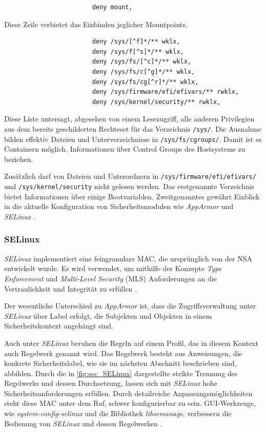 \documentclass[../main.tex]{subfiles}
\begin{document}
					\begin{lstlisting}
						deny mount,
					\end{lstlisting}
					Diese Zeile verbietet das Einbinden jeglicher Mountpoints.

					\begin{lstlisting}
						deny /sys/[^f]*/** wklx,
						deny /sys/f[^s]*/** wklx,
						deny /sys/fs/[^c]*/** wklx,
						deny /sys/fs/c[^g]*/** wklx,
						deny /sys/fs/cg[^r]*/** wklx,
						deny /sys/firmware/efi/efivars/** rwklx,
						deny /sys/kernel/security/** rwklx,
					\end{lstlisting}
					Diese Liste untersagt, abgesehen von einem Lesezugriff, alle anderen Privilegien aus dem bereits geschilderten Rechteset für das Verzeichnis \texttt{/sys/}. Die Ausnahme bilden effektiv Dateien und Unterverzeichnisse in \texttt{/sys/fs/cgroups/}. Damit ist es Containern möglich, Informationen über Control Groups des Hostsystems zu beziehen.

					Zusätzlich darf von Dateien und Unterordnern in \texttt{/sys/firmware/efi/efivars/} und \texttt{/sys/kernel/security} nicht gelesen werden. Das erstgenannte Verzeichnis bietet Informationen über einige Bootvariablen. Zweitgenanntes gewährt Einblick in die aktuelle Konfiguration von Sicherheitsmodulen wie \emph{AppArmor} und \emph{SELinux} \cite{apparmorEFI}\cite{apparmorSecurityFS}\cite{apparmorLWNSecurityFS}.

  		\subsubsection{\acrshort{SELinux}}
			\label{selinux}
				\emph{SELinux} implementiert eine feingranulare MAC, die ursprünglich von der \acrshort{NSA} entwickelt wurde. Es wird verwendet, um mithilfe der Konzepte \emph{Type Enforcement} und \emph{Multi-Level Security} (\acrshort{MLS}) Anforderungen an die Vertraulichkeit und Integrität zu erfüllen \cite{redhatSec}. %

				Der wesentliche Unterschied zu \emph{AppArmor} ist, dass die Zugriffsverwaltung unter \emph{SELinux} über Label erfolgt, die Subjekten und Objekten in einem Sicherheitskontext angehängt sind.


				Auch unter \emph{SELinux} beruhen die Regeln auf einem Profil, das in diesem Kontext auch Regelwerk genannt wird. Das Regelwerk besteht aus Anweisungen, die konkrete Sicherheitslabel, wie sie im nächsten Abschnitt beschrieben sind, abbilden. Durch die in \fig \ref{fig:sec_SELinux} dargestellte strikte Trennung des Regelwerks und dessen Durchsetzung, lassen sich mit \emph{SELinux} hohe Sicherheitsanforderungen erfüllen. Durch detailreiche Anpassungsmöglichkeiten steht diese MAC unter dem Ruf, schwer konfigurierbar zu sein. \acrshort{GUI}-Werkzeuge, wie \emph{system-config-selinux} und die Bibliothek \emph{libsemanage}, verbessern die Bedienung von \emph{SELinux} und dessen Regelwerken \cite[S.62,67]{linuxMagazineSec}.
\end{document}
